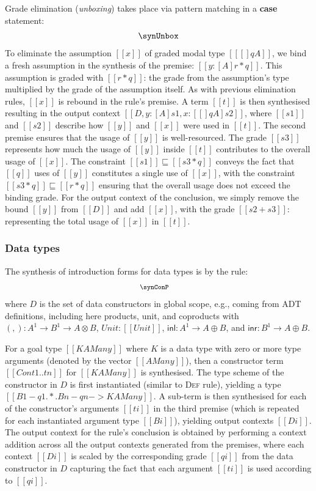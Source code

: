 Grade elimination (\textit{unboxing}) takes place via
pattern matching in a \textbf{case} statement:
\begin{align*}
  \synUnbox
\end{align*}
To eliminate the assumption $[[ x ]]$ of graded modal type $[[ [] q
A ]]$, we bind a fresh assumption in the synthesis of the premise: $[[ y : [A]
{r * q} ]]$. This assumption is graded with $[[ {r * q} ]]$: the grade from the
assumption's type multiplied by the grade of the assumption itself. As with
previous elimination rules, $[[ x ]]$ is rebound in the rule's premise. A
term $[[ t ]]$ is then synthesised resulting in the output context $[[ {D, y :
[A] s1}, x : [ [] q A ] {s2} ]]$, where $[[ s1 ]]$ and $[[ s2 ]]$ describe how
$[[ y ]]$ and $[[ x ]]$ were used in $[[ t ]]$. The second premise ensures that
the usage of $[[ y ]]$ is well-resourced. The grade $[[ s3 ]]$ represents how
much the usage of $[[ y ]]$ inside $[[ t]]$ contributes to the overall usage of
$ [[ x]]$. The constraint $[[ s1 ]] \sqsubseteq [[ s3 * q ]]$ conveys the fact
that $[[ q ]]$ uses of $[[y]]$ constitutes a single use of $[[ x ]]$, with the constraint
$[[ s3 * q ]] \sqsubseteq [[r * q]]$ ensuring that the overall usage does not exceed the binding grade. For the
output context of the conclusion, we simply remove the bound $[[y]]$ from $[[ D
]]$ and add $[[ x ]]$, with the grade $[[ s2 + s3 ]]$: representing the total
usage of $[[ x ]]$ in $[[ t ]]$.

\subsubsection{Data types}

The synthesis of introduction forms for data types is by the \GRANULEdruleConName rule:
\begin{align*}
  \hspace{-1em}{\footnotesize{
    \synConP
  }}
\end{align*}
where $D$ is the set of data constructors in global scope, e.g., coming from ADT
definitions, including here products, unit, and coproducts with $(,) : A^1 \rightarrow B^1
\rightarrow A \otimes B$, $Unit : [[ Unit ]]$, $\mathsf{inl} : A^1
\rightarrow A \oplus B$, and $\mathsf{inr} : B^1 \rightarrow A \oplus B$.

For a goal type $[[ K {A Many} ]]$ where $K$ is a data type with zero or more
type arguments (denoted by the vector $[[ A Many ]]$), then a constructor term
$[[ Con t1 .. tn ]]$ for $[[ K {A Many} ]]$ is synthesised. The type scheme of
the constructor in $D$ is first instantiated (similar to \textsc{Def} rule),
yielding a type $ [[ {B1 - q1 .*. Bn -
qn -> {K {A Many}}} ]] $. A sub-term is then synthesised for each of the
constructor's arguments $[[ ti ]]$ in the third premise (which is repeated for
each instantiated argument type $[[ Bi ]]$), yielding output contexts $[[ Di
]]$. The output context for the rule's conclusion is obtained by performing a
context addition across all the output contexts generated from the premises,
where each context $[[ Di ]]$ is scaled by the corresponding grade $[[ qi ]]$
from the data constructor in $D$ capturing the fact that each argument $[[ ti
]]$ is used according to $[[ qi ]]$.

